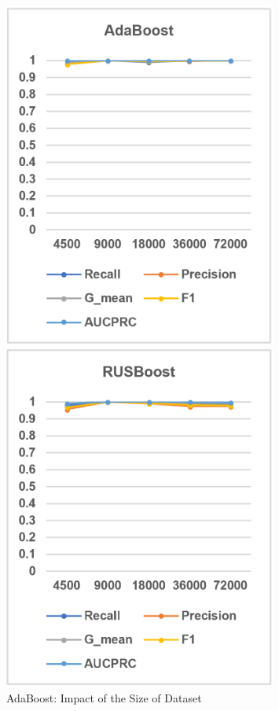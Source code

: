 \begin{figure}[H]
    \centering 
    \begin{minipage}{0.31\textwidth}
        \centering
        \includegraphics[width=0.8\textwidth]{images/fig24}
        \caption{AdaBoost: Impact of the Size of Dataset}
        \label{fig24}
    \end{minipage}
    \hspace{5pt}
    \begin{minipage}{0.31\textwidth}
        \centering
        \includegraphics[width=0.8\textwidth]{images/fig25}

\end{minipage}
\end{figure}
